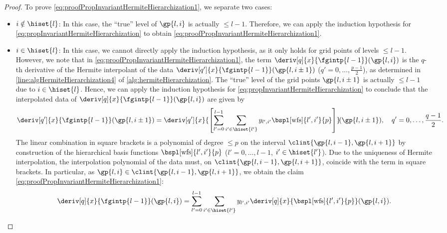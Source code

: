 \begin{proof}
  To prove \eqref{eq:proofPropInvariantHermiteHierarchization1},
  we separate two cases:
  \begin{itemize}
    \item
    $i \notin \hiset{l}$:
    In this case, the ``true'' level of $\gp{l,i}$ is actually $\le l - 1$.
    Therefore, we can apply the induction hypothesis
    for \cref{eq:propInvariantHermiteHierarchization} to
    obtain \eqref{eq:proofPropInvariantHermiteHierarchization1}.
    
    \item
    $i \in \hiset{l}$:
    In this case, we cannot directly apply the induction hypothesis,
    as it only holds for grid points of levels $\le l - 1$.
    However, we note that in
    \eqref{eq:proofPropInvariantHermiteHierarchization1},
    the term $\deriv[q]{x}{\fgintp{l-1}}(\gp{l,i})$
    is the $q$-th derivative of the Hermite interpolant of
    the data $\deriv[q']{x}{\fgintp{l-1}}(\gp{l,i\pm1})$
    ($q' = 0, \dotsc, \frac{p-1}{2}$),
    as determined in \cref{line:algHermiteHierarchization4}
    of \cref{alg:hermiteHierarchization}.
    The ``true'' level of the grid points $\gp{l,i\pm1}$ is
    actually $\le l - 1$ due to $i \in \hiset{l}$.
    Hence, we can apply the induction hypothesis
    for \cref{eq:propInvariantHermiteHierarchization}
    to conclude that the interpolated data of
    $\deriv[q]{x}{\fgintp{l-1}}(\gp{l,i})$ are given by
    \begin{equation}
      \deriv[q']{x}{\fgintp{l-1}}(\gp{l,i\pm1})
      = \deriv[q']{x}{
        \left[\sum_{l'=0}^{l-1} \sum_{i' \in \hiset{l'}}
        \linout{l',i'} \bspl[\wfs]{l',i'}{p}\right]
      }\!(\gp{l,i\pm1}),\quad
      q' = 0, \dotsc, \frac{q-1}{2}.
    \end{equation}
    The linear combination in square brackets
    is a polynomial of degree $\le p$ on the interval
    $\clint{\gp{l,i-1}, \gp{l,i+1}}$
    by construction of the hierarchical basis functions
    $\bspl[\wfs]{l',i'}{p}$ ($l' = 0, \dotsc, l - 1$, $i' \in \hiset{l'}$).
    Due to the uniqueness of Hermite interpolation,
    the interpolation polynomial of the data must,
    on $\clint{\gp{l,i-1}, \gp{l,i+1}}$,
    coincide with the term in square brackets.
    In particular, as $\gp{l,i} \in \clint{\gp{l,i-1}, \gp{l,i+1}}$,
    we obtain the claim \eqref{eq:proofPropInvariantHermiteHierarchization1}:
    \begin{equation}
      \deriv[q]{x}{\fgintp{l-1}}(\gp{l,i})
      = \sum_{l'=0}^{l-1} \sum_{i' \in \hiset{l'}}
      \linout{l',i'} \deriv[q]{x}{\bspl[\wfs]{l',i'}{p}}(\gp{l,i}).

\end{equation}
\end{itemize}
\end{proof}
